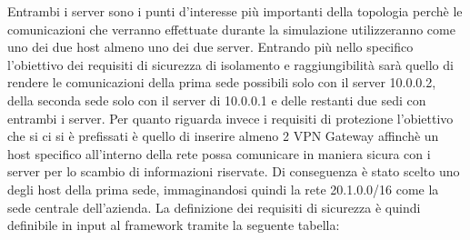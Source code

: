 Entrambi i server sono i punti d'interesse più importanti della topologia perchè le comunicazioni che verranno effettuate durante la simulazione utilizzeranno come 
uno dei due host almeno uno dei due server. Entrando più nello specifico l'obiettivo dei requisiti di sicurezza di isolamento e raggiungibilità sarà quello di rendere le 
comunicazioni della prima sede possibili solo con il server 10.0.0.2, della seconda sede solo con il server di 10.0.0.1 e delle restanti due sedi con entrambi i server. Per quanto riguarda
invece i requisiti di protezione l'obiettivo che si ci si è prefissati è quello di inserire almeno 2 VPN Gateway affinchè un host specifico all'interno della rete possa comunicare in maniera
sicura con i server per lo scambio di informazioni riservate. Di conseguenza è stato scelto uno degli host della prima sede, immaginandosi quindi la rete 20.1.0.0/16 come la sede centrale dell'azienda.
La definizione dei requisiti di sicurezza è quindi definibile in input al framework tramite la seguente tabella:

